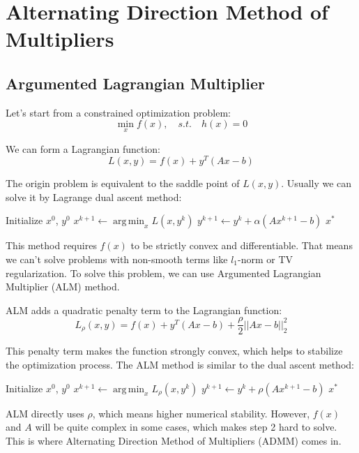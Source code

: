 \documentclass[lang=en,color=blue,mode=fancy,titlestyle=hang]{elegantbook}
\DeclareMathOperator*{\argmin}{arg\,min}
\begin{document}
\section{Alternating Direction Method of Multipliers}
\subsection{Argumented Lagrangian Multiplier}

Let's start from a constrained optimization problem:
\[
  \min_x f(x), \quad s.t. \quad h(x) = 0
\]

We can form a Lagrangian function:
\[
  L(x, y) = f(x) + y^T (Ax - b)
\]

The origin problem is equivalent to the saddle point of $L(x, y)$. Usually we can
solve it by Lagrange dual ascent method:
\begin{algorithm}[H]
\caption{Lagrange Dual Ascent Method}
\begin{algorithmic}
\State Initialize $x^0$, $y^0$
  \State $x^{k+1} \gets \argmin_x L(x, y^k)$
  \State $y^{k+1} \gets y^k + \alpha (A x^{k+1} - b)$
\EndWhile
\State \Return $x^*$
\end{algorithmic}
\end{algorithm}

This method requires $f(x)$ to be strictly convex and differentiable. That means
we can't solve problems with non-smooth terms like $l_1$-norm or TV regularization.
To solve this problem, we can use Argumented Lagrangian Multiplier (ALM) method.

ALM adds a quadratic penalty term to the Lagrangian function:
\[
  L_\rho(x, y) = f(x) + y^T (Ax - b) + \frac{\rho}{2} ||Ax - b||_2^2
\]

This penalty term makes the function strongly convex, which helps to stabilize the
optimization process. The ALM method is similar to the dual ascent method:
\begin{algorithm}[H]
\caption{Augmented Lagrangian Multiplier}
\begin{algorithmic}
\State Initialize $x^0$, $y^0$
  \State $x^{k+1} \gets \argmin_x L_\rho(x, y^k)$
  \State $y^{k+1} \gets y^k + \rho (A x^{k+1} - b)$
\EndWhile
\State \Return $x^*$
\end{algorithmic}
\end{algorithm}

ALM directly uses $\rho$, which means higher numerical stability. However, $f(x)$
and $A$ will be quite complex in some cases, which makes step 2 hard to solve.
This is where Alternating Direction Method of Multipliers (ADMM) comes in.
\end{document}
